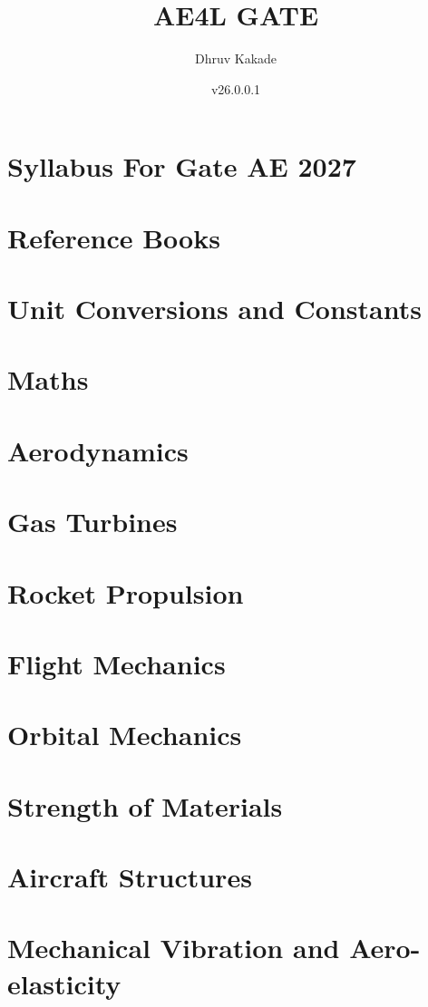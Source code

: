 \documentclass{book}
\title{AE4L GATE}
\author{Dhruv Kakade}
\date{v26.0.0.1}
\begin{document}
\begin{titlepage}
  \maketitle

\end{titlepage}

\clearpage
\tableofcontents
\listoftables
\listoffigures
\clearpage

\chapter{Syllabus For Gate AE 2027}



\chapter{Reference Books}



\chapter{Unit Conversions and Constants}



\chapter{Maths}

\chapter{Aerodynamics}

\chapter{Gas Turbines}

\chapter{Rocket Propulsion}

\chapter{Flight Mechanics}

\chapter{Orbital Mechanics}

\chapter{Strength of Materials}

\chapter{Aircraft Structures}

\chapter{Mechanical Vibration and Aero-elasticity}
\end{document}
